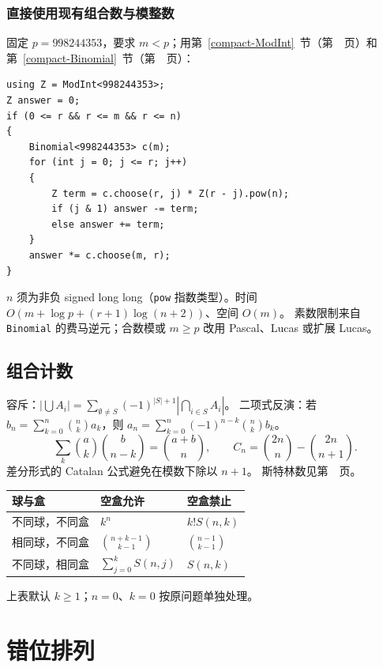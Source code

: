 \subsubsection{直接使用现有组合数与模整数}
固定 $p=998244353$，要求 $m<p$；用第~\ref{compact-ModInt}~节（第~\pageref{compact-ModInt}~页）和
第~\ref{compact-Binomial}~节（第~\pageref{compact-Binomial}~页）：
\begin{lstlisting}
using Z = ModInt<998244353>;
Z answer = 0;
if (0 <= r && r <= m && r <= n)
{
    Binomial<998244353> c(m);
    for (int j = 0; j <= r; j++)
    {
        Z term = c.choose(r, j) * Z(r - j).pow(n);
        if (j & 1) answer -= term;
        else answer += term;
    }
    answer *= c.choose(m, r);
}
\end{lstlisting}
$n$ 须为非负 signed long long（\texttt{pow} 指数类型）。时间 $O(m+\log p+(r+1)\log(n+2))$、空间 $O(m)$。
素数限制来自 \texttt{Binomial} 的费马逆元；合数模或 $m\ge p$ 改用 Pascal、Lucas 或扩展 Lucas。


\subsection{组合计数}\label{knowledge-counting-identities}
容斥：$|\bigcup A_i|=\sum_{\emptyset\ne S}(-1)^{|S|+1}|\bigcap_{i\in S}A_i|$。
二项式反演：若 $b_n=\sum_{k=0}^{n}\binom nk a_k$，则
$a_n=\sum_{k=0}^{n}(-1)^{n-k}\binom nk b_k$。
\[
\sum_k\binom ak\binom b{n-k}=\binom{a+b}n,\qquad
C_n=\binom{2n}n-\binom{2n}{n+1}.
\]
差分形式的 Catalan 公式避免在模数下除以 $n+1$。
斯特林数见第~\pageref{knowledge-stirling-definitions}~页。
\begin{center}
\begin{tabular}{lll}
\toprule
球与盒 & 空盒允许 & 空盒禁止\\\midrule
不同球，不同盒 & $k^n$ & $k!S(n,k)$\\
相同球，不同盒 & $\binom{n+k-1}{k-1}$ & $\binom{n-1}{k-1}$\\
不同球，相同盒 & $\sum_{j=0}^{k}S(n,j)$ & $S(n,k)$\\
\bottomrule
\end{tabular}
\end{center}
上表默认 $k\ge1$；$n=0$、$k=0$ 按原问题单独处理。



\Needspace{180pt}

\section{错位排列}

